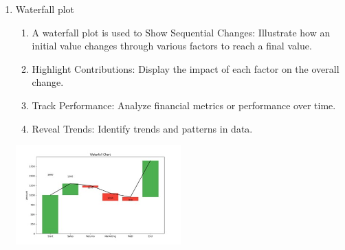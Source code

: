 \documentclass[12pt]{article}
\begin{document}
\begin{enumerate}
\begin{minipage}{\linewidth}
\begin{center}
            \label{fig:Coxcomb_chart}
        \end{center}
    \end{minipage}
    \item Waterfall plot
    \begin{enumerate}
        \item A waterfall plot is used to Show Sequential Changes: Illustrate how an initial value changes through various factors to reach a final value.
        \item Highlight Contributions: Display the impact of each factor on the overall change.
        \item Track Performance: Analyze financial metrics or performance over time.
        \item Reveal Trends: Identify trends and patterns in data.
    \end{enumerate} 
    \begin{minipage}{\linewidth}
        \begin{center}
            \includegraphics[width=0.5\textwidth]{Waterfall.jpg}
            \label{fig:Waterfall_plot}
        \end{center}
    \end{minipage}
\end{enumerate}
\end{document}
